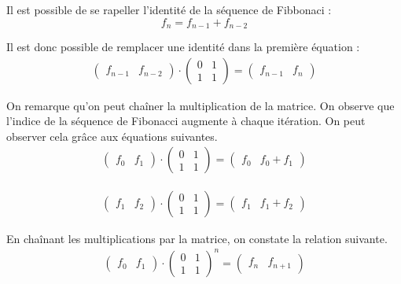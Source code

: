 \documentclass[12pt]{article}
\begin{document}
Il est possible de se rapeller l'identité de la séquence de Fibbonaci :
\[ f_{n} = f_{n-1} + f_{n-2} \]

Il est donc possible de remplacer une identité dans la première équation :
\begin{align*}
	\begin{pmatrix}
		f_{n-1} & f_{n-2}
	\end{pmatrix}
	\cdot
	\begin{pmatrix}
		0 & 1 \\
		1 & 1
	\end{pmatrix}
	=
	\begin{pmatrix}
		f_{n-1} & f_{n}
	\end{pmatrix}
\end{align*}

On remarque qu'on peut chaîner la multiplication de la matrice. On observe que l'indice de la séquence de Fibonacci augmente à chaque itération. On peut observer cela grâce aux équations suivantes.
\begin{align*}
	\begin{pmatrix}
		f_{0} & f_{1}
	\end{pmatrix}
	\cdot
	\begin{pmatrix}
		0 & 1 \\
		1 & 1
	\end{pmatrix}
	=
	\begin{pmatrix}
		f_{0} & f_{0} + f_{1}
	\end{pmatrix}
\end{align*}

\begin{align*}
	\begin{pmatrix}
		f_{1} & f_{2}
	\end{pmatrix}
	\cdot
	\begin{pmatrix}
		0 & 1 \\
		1 & 1
	\end{pmatrix}
	=
	\begin{pmatrix}
		f_{1} & f_{1} + f_{2}
	\end{pmatrix}
\end{align*}

En chaînant les multiplications par la matrice, on constate la relation suivante.
\begin{align*}
	\begin{pmatrix}
		f_{0} & f_{1}
	\end{pmatrix}
	\cdot
	\begin{pmatrix}
		0 & 1 \\
		1 & 1
	\end{pmatrix}
	^n
	=
	\begin{pmatrix}
		f_{n} & f_{n+1}
	\end{pmatrix}
\end{align*}
\end{document}

